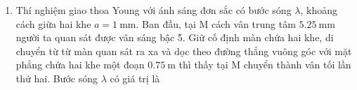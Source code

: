 \begin{enumerate}[label=\bfseries Câu \arabic*:]
\item Thí nghiệm giao thoa Young với ánh sáng đơn sắc có bước sóng $\lambda$, khoảng cách giữa hai khe $a=\SI{1}{\milli\meter}$. Ban đầu, tại M cách vân trung tâm $\SI{5.25}{\milli\meter}$ người ta quan sát được vân sáng bậc 5. Giữ cố định màn chứa hai khe, di chuyển từ từ màn quan sát ra xa và dọc theo đường thẳng vuông góc với mặt phẳng chứa hai khe một đoạn $\SI{0.75}{\meter}$ thì thấy tại M chuyển thành vân tối lần thứ hai. Bước sóng $\lambda$ có giá trị là

\end{enumerate}